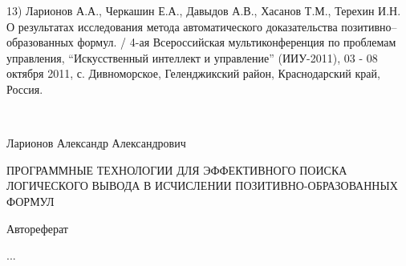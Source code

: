 \documentclass[a4paper]{report}
\begin{document}
13) Ларионов А.А., Черкашин Е.А., Давыдов А.В., Хасанов Т.М., Терехин
И.Н. О результатах исследования метода автоматического доказательства
позитивно--образованных формул. / 4-ая Всероссийская мультиконференция
по проблемам управления, ``Искусственный интеллект и управление''
(ИИУ-2011), 03 - 08 октября 2011, с. Дивноморское, Геленджикский
район, Краснодарский край, Россия.

\newpage
\mbox{~}
\vfill{}
\begin{center}

Ларионов Александр Александрович

ПРОГРАММНЫЕ ТЕХНОЛОГИИ ДЛЯ ЭФФЕКТИВНОГО ПОИСКА ЛОГИЧЕСКОГО ВЫВОДА В ИСЧИСЛЕНИИ ПОЗИТИВНО-ОБРАЗОВАННЫХ ФОРМУЛ

Автореферат

...
\end{center}
\vspace{1cm}{}
\mbox{~}
%
%
%
%
%

%

%
\end{document}
